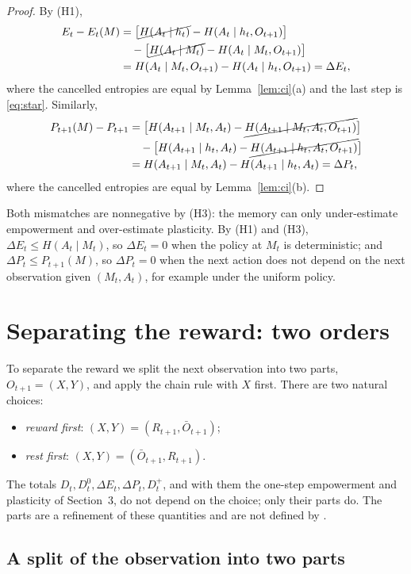 \documentclass{article}
\theoremstyle{definition}
\theoremstyle{remark}
\newcommand{\dE}{\Delta E}
\newcommand{\dP}{\Delta P}
\newcommand{\Ob}{\bar O}
\begin{document}
\begin{proof}
By (H1),
\begin{align*}
E_t-E_t(M)
&=\big[\cancel{H(A_t\mid h_t)}-H(A_t\mid h_t,O_{t+1})\big]\\
&\quad-\big[\cancel{H(A_t\mid M_t)}-H(A_t\mid M_t,O_{t+1})\big]\\
&=H(A_t\mid M_t,O_{t+1})-H(A_t\mid h_t,O_{t+1})=\dE_t,
\end{align*}
where the cancelled entropies are equal by Lemma~\ref{lem:ci}(a) and the last step is \eqref{eq:star}. Similarly,
\begin{align*}
P_{t+1}(M)-P_{t+1}
&=\big[H(A_{t+1}\mid M_t,A_t)-\cancel{H(A_{t+1}\mid M_t,A_t,O_{t+1})}\big]\\
&\quad-\big[H(A_{t+1}\mid h_t,A_t)-\cancel{H(A_{t+1}\mid h_t,A_t,O_{t+1})}\big]\\
&=H(A_{t+1}\mid M_t,A_t)-H(A_{t+1}\mid h_t,A_t)=\dP_t,
\end{align*}
where the cancelled entropies are equal by Lemma~\ref{lem:ci}(b).
\end{proof}

Both mismatches are nonnegative by (H3): the memory can only under-estimate empowerment and over-estimate plasticity. By (H1) and (H3), $\dE_t\le H(A_t\mid M_t)$, so $\dE_t=0$ when the policy at $M_t$ is deterministic; and $\dP_t\le P_{t+1}(M)$, so $\dP_t=0$ when the next action does not depend on the next observation given $(M_t,A_t)$, for example under the uniform policy.

\section{Separating the reward: two orders}

To separate the reward we split the next observation into two parts, $O_{t+1}=(X,Y)$, and apply the chain rule with $X$ first. There are two natural choices:
\begin{itemize}
\item \emph{reward first}: $(X,Y)=(R_{t+1},\Ob_{t+1})$;
\item \emph{rest first}: $(X,Y)=(\Ob_{t+1},R_{t+1})$.
\end{itemize}
The totals $D_t,D^0_t,\dE_t,\dP_t,D^+_t$, and with them the one-step empowerment and plasticity of Section~3, do not depend on the choice; only their parts do. The parts are a refinement of these quantities and are not defined by \citet{abel2025plasticity}.

\subsection{A split of the observation into two parts}
\end{document}
